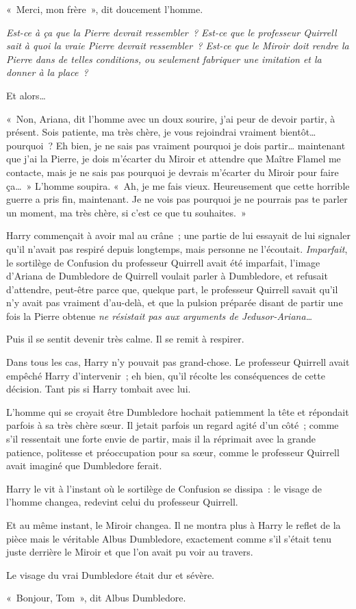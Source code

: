 «~Merci, mon frère~», dit doucement l'homme.

\emph{Est-ce à ça que la Pierre devrait ressembler~? Est-ce que le professeur Quirrell sait à quoi la vraie Pierre devrait ressembler~? Est-ce que le Miroir doit rendre la Pierre dans de telles conditions, ou seulement fabriquer une imitation et la donner à la place~?}

Et alors…

«~Non, Ariana, dit l'homme avec un doux sourire, j'ai peur de devoir partir, à présent. Sois patiente, ma très chère, je vous rejoindrai vraiment bientôt… pourquoi~? Eh bien, je ne sais pas vraiment pourquoi je dois partir… maintenant que j'ai la Pierre, je dois m'écarter du Miroir et attendre que Maître Flamel me contacte, mais je ne sais pas pourquoi je devrais m'écarter du Miroir pour faire ça…~» L'homme soupira. «~Ah, je me fais vieux. Heureusement que cette horrible guerre a pris fin, maintenant. Je ne vois pas pourquoi je ne pourrais pas te parler un moment, ma très chère, si c'est ce que tu souhaites.~»

Harry commençait à avoir mal au crâne~; une partie de lui essayait de lui signaler qu'il n'avait pas respiré depuis longtemps, mais personne ne l'écoutait. \emph{Imparfait}, le sortilège de Confusion du professeur Quirrell avait été imparfait, l'image d'Ariana de Dumbledore de Quirrell voulait parler à Dumbledore, et refusait d'attendre, peut-être parce que, quelque part, le professeur Quirrell savait qu'il n'y avait pas vraiment d'au-delà, et que la pulsion préparée disant de partir une fois la Pierre obtenue \emph{ne résistait pas aux arguments de Jedusor-Ariana…}

Puis il se sentit devenir très calme. Il se remit à respirer.

Dans tous les cas, Harry n'y pouvait pas grand-chose. Le professeur Quirrell avait empêché Harry d'intervenir~; eh bien, qu'il récolte les conséquences de cette décision. Tant pis si Harry tombait avec lui.

L'homme qui se croyait être Dumbledore hochait patiemment la tête et répondait parfois à sa très chère sœur. Il jetait parfois un regard agité d'un côté~; comme s'il ressentait une forte envie de partir, mais il la réprimait avec la grande patience, politesse et préoccupation pour sa sœur, comme le professeur Quirrell avait imaginé que Dumbledore ferait.

Harry le vit à l'instant où le sortilège de Confusion se dissipa~: le visage de l'homme changea, redevint celui du professeur Quirrell.

Et au même instant, le Miroir changea. Il ne montra plus à Harry le reflet de la pièce mais le véritable Albus Dumbledore, exactement comme s'il s'était tenu juste derrière le Miroir et que l'on avait pu voir au travers.

Le visage du vrai Dumbledore était dur et sévère.

«~Bonjour, Tom~», dit Albus Dumbledore.
